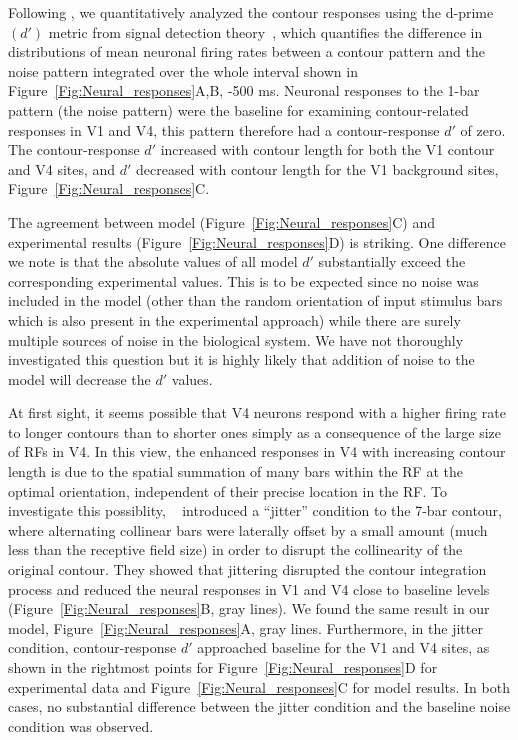 Following \cite{Chen_etal14}, 
we quantitatively analyzed the contour responses using the d-prime
$(d')$ metric from signal detection theory~\citep{Green_Swets66}, which
quantifies the difference in distributions of mean neuronal firing
rates between a contour pattern and the noise pattern integrated over
the whole interval shown in Figure~\ref{Fig:Neural_responses}A,B, -500 ms.  Neuronal responses to the 1-bar pattern (the noise pattern)
were the baseline for examining contour-related responses in V1 and
V4, this pattern therefore had a contour-response $d'$ of zero. The
contour-response $d'$ increased with contour length for both the V1
contour and V4 sites, and $d'$ decreased with contour length for the V1
background sites, Figure~\ref{Fig:Neural_responses}C.

The agreement between model (Figure~\ref{Fig:Neural_responses}C) and
experimental results (Figure~\ref{Fig:Neural_responses}D) is striking.
One difference we note is that the absolute values of all model $d'$
substantially exceed the corresponding experimental values. 
This is to be expected since no noise was included in the model 
(other than the random orientation of input
stimulus bars which is also present in the experimental approach)
while there are surely multiple sources of noise in the biological
system. We have not thoroughly investigated this question but it is
highly likely that addition of noise to the model will decrease the $d'$
values.

At first sight, it seems possible that 
V4 neurons respond with a higher firing rate to longer contours than
to shorter ones simply as a consequence of 
the large size of RFs in V4. 
In this view, the enhanced responses in V4 with increasing contour
length is due to the spatial summation of many bars
within the RF at the optimal orientation,
independent of their precise location in the RF. 
To  investigate this possiblity,
~\cite{Chen_etal14} introduced a ``jitter'' condition to the 7-bar
contour, where alternating collinear bars were laterally offset 
by a small amount (much less than the receptive field size)
in order to disrupt the collinearity of the original contour. They
showed that jittering disrupted the 
contour integration process and reduced the neural responses in V1
and V4 close to baseline levels (Figure~\ref{Fig:Neural_responses}B,
gray lines). We found the same result in our model,
Figure~\ref{Fig:Neural_responses}A, gray lines.  Furthermore, in the
jitter condition, contour-response $d'$ approached baseline for the
V1 and V4 sites, as shown in the rightmost points for
Figure~\ref{Fig:Neural_responses}D for experimental data and
Figure~\ref{Fig:Neural_responses}C for model results. In both cases,
no substantial difference between the jitter condition and the
baseline noise condition was observed.

